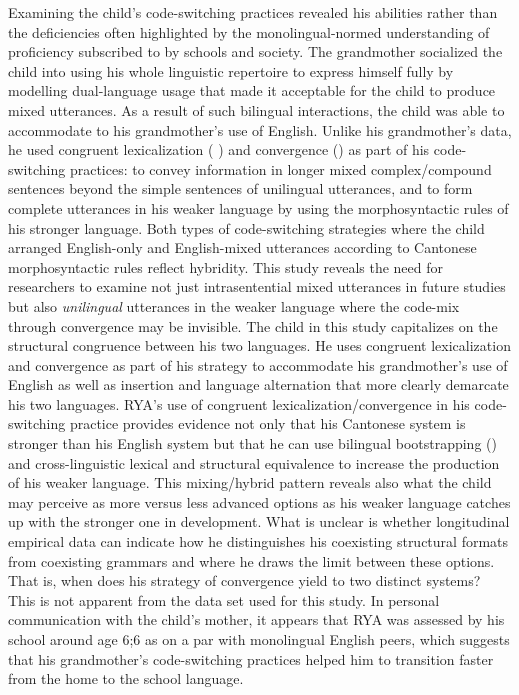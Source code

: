 \documentclass[output=paper,colorlinks,citecolor=brown]{langscibook}
\begin{document}
Examining the child’s code-switching practices revealed his abilities rather than the deficiencies often highlighted by the monolingual-normed understanding of proficiency subscribed to by schools and society. The grandmother socialized the child into using his whole linguistic repertoire to express himself fully by modelling dual-language usage that made it acceptable for the child to produce mixed utterances. As a result of such bilingual interactions, the child was able to accommodate to his grandmother’s use of English. Unlike his grandmother’s data, he used congruent lexicalization (\citeauthor{Muysken1997} \citeyear{Muysken1997,Muysken2000}) and convergence (\citealt{BullockToribio2004, Clyne2003, Toribio2004}) as part of his code-switching practices:  to convey information in longer mixed complex/compound sentences beyond the simple sentences of unilingual utterances, and  to form complete utterances in his weaker language by using the morphosyntactic rules of his stronger language. Both types of code-switching strategies where the child arranged English-only and English-mixed utterances according to Cantonese morphosyntactic rules reflect hybridity. This study reveals the need for researchers to examine not just intrasentential mixed utterances in future studies but also \textit{unilingual} utterances in the weaker language where the code-mix through convergence may be invisible. The child in this study capitalizes on the structural congruence between his two languages. He uses congruent lexicalization and convergence as part of his strategy to accommodate his grandmother’s use of English as well as insertion and language alternation that more clearly demarcate his two languages. RYA’s use of congruent lexicalization/convergence in his code-switching practice provides evidence not only that his Cantonese system is stronger than his English system but that he can use bilingual bootstrapping (\citealt{Gawlitzek-MaiwaldTracy1996}) and cross-linguistic lexical and structural equivalence to increase the production of his weaker language. This mixing/hybrid pattern reveals also what the child may perceive as more versus less advanced options as his weaker language catches up with the stronger one in development. What is unclear is whether longitudinal empirical data can indicate how he distinguishes his coexisting structural formats from coexisting grammars and where he draws the limit between these options. That is, when does his strategy of convergence yield to two distinct systems? This is not apparent from the data set used for this study. In personal communication with the child’s mother, it appears that RYA was assessed by his school around age 6;6 as on a par with monolingual English peers, which suggests that his grandmother’s code-switching practices helped him to transition faster from the home to the school language.
\end{document}
